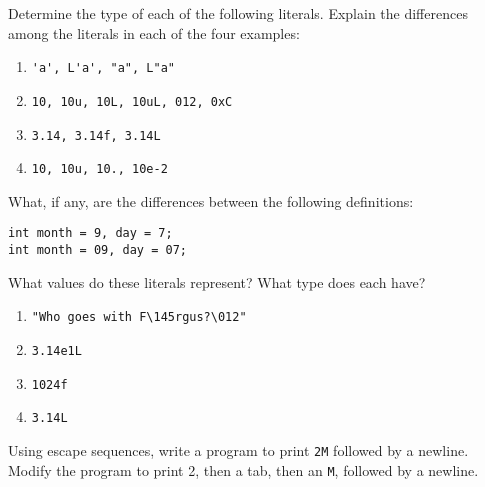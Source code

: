 %
%
\begin{question}
Determine the type of each of the following literals. Explain
the differences among the literals in each of the four examples:
\begin{enumerate}[label=(\alph*)]
^^I\item \verb|'a', L'a', "a", L"a"|
^^I\item \verb|10, 10u, 10L, 10uL, 012, 0xC|
^^I\item \verb|3.14, 3.14f, 3.14L|
^^I\item \verb|10, 10u, 10., 10e-2|
\end{enumerate}
\end{question}

\begin{question}
What, if any, are the differences between the following
definitions:
\begin{lstlisting}
int month = 9, day = 7;
int month = 09, day = 07;
\end{lstlisting}
\end{question}

\begin{question}
What values do these literals represent? What type does each
have?
\begin{enumerate}[label=(\alph*)]
^^I\item \verb|"Who goes with F\145rgus?\012"|
^^I\item \verb|3.14e1L|
^^I\item \verb|1024f|
^^I\item \verb|3.14L|
\end{enumerate}
\end{question}

\begin{question}
Using escape sequences, write a program to print \verb|2M| followed
by a newline. Modify the program to print 2, then a tab, then an \verb|M|, followed
by a newline.
\end{question}
